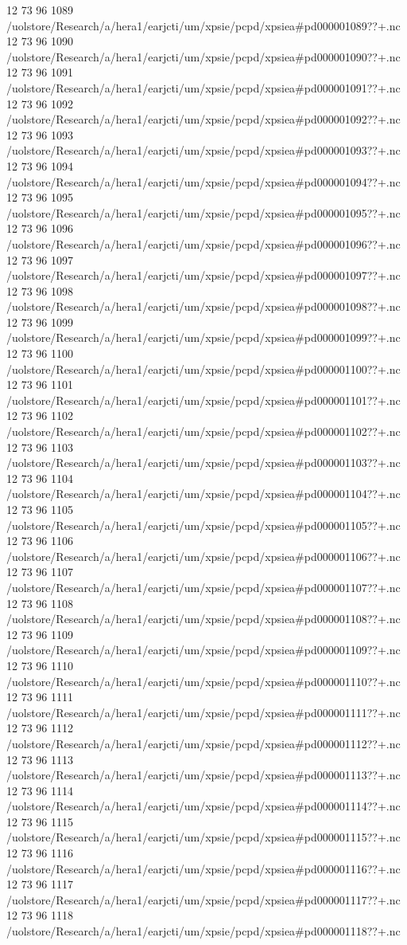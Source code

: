 12 73 96
1089
/uolstore/Research/a/hera1/earjcti/um/xpsie/pcpd/xpsiea#pd000001089??+.nc
12 73 96
1090
/uolstore/Research/a/hera1/earjcti/um/xpsie/pcpd/xpsiea#pd000001090??+.nc
12 73 96
1091
/uolstore/Research/a/hera1/earjcti/um/xpsie/pcpd/xpsiea#pd000001091??+.nc
12 73 96
1092
/uolstore/Research/a/hera1/earjcti/um/xpsie/pcpd/xpsiea#pd000001092??+.nc
12 73 96
1093
/uolstore/Research/a/hera1/earjcti/um/xpsie/pcpd/xpsiea#pd000001093??+.nc
12 73 96
1094
/uolstore/Research/a/hera1/earjcti/um/xpsie/pcpd/xpsiea#pd000001094??+.nc
12 73 96
1095
/uolstore/Research/a/hera1/earjcti/um/xpsie/pcpd/xpsiea#pd000001095??+.nc
12 73 96
1096
/uolstore/Research/a/hera1/earjcti/um/xpsie/pcpd/xpsiea#pd000001096??+.nc
12 73 96
1097
/uolstore/Research/a/hera1/earjcti/um/xpsie/pcpd/xpsiea#pd000001097??+.nc
12 73 96
1098
/uolstore/Research/a/hera1/earjcti/um/xpsie/pcpd/xpsiea#pd000001098??+.nc
12 73 96
1099
/uolstore/Research/a/hera1/earjcti/um/xpsie/pcpd/xpsiea#pd000001099??+.nc
12 73 96
1100
/uolstore/Research/a/hera1/earjcti/um/xpsie/pcpd/xpsiea#pd000001100??+.nc
12 73 96
1101
/uolstore/Research/a/hera1/earjcti/um/xpsie/pcpd/xpsiea#pd000001101??+.nc
12 73 96
1102
/uolstore/Research/a/hera1/earjcti/um/xpsie/pcpd/xpsiea#pd000001102??+.nc
12 73 96
1103
/uolstore/Research/a/hera1/earjcti/um/xpsie/pcpd/xpsiea#pd000001103??+.nc
12 73 96
1104
/uolstore/Research/a/hera1/earjcti/um/xpsie/pcpd/xpsiea#pd000001104??+.nc
12 73 96
1105
/uolstore/Research/a/hera1/earjcti/um/xpsie/pcpd/xpsiea#pd000001105??+.nc
12 73 96
1106
/uolstore/Research/a/hera1/earjcti/um/xpsie/pcpd/xpsiea#pd000001106??+.nc
12 73 96
1107
/uolstore/Research/a/hera1/earjcti/um/xpsie/pcpd/xpsiea#pd000001107??+.nc
12 73 96
1108
/uolstore/Research/a/hera1/earjcti/um/xpsie/pcpd/xpsiea#pd000001108??+.nc
12 73 96
1109
/uolstore/Research/a/hera1/earjcti/um/xpsie/pcpd/xpsiea#pd000001109??+.nc
12 73 96
1110
/uolstore/Research/a/hera1/earjcti/um/xpsie/pcpd/xpsiea#pd000001110??+.nc
12 73 96
1111
/uolstore/Research/a/hera1/earjcti/um/xpsie/pcpd/xpsiea#pd000001111??+.nc
12 73 96
1112
/uolstore/Research/a/hera1/earjcti/um/xpsie/pcpd/xpsiea#pd000001112??+.nc
12 73 96
1113
/uolstore/Research/a/hera1/earjcti/um/xpsie/pcpd/xpsiea#pd000001113??+.nc
12 73 96
1114
/uolstore/Research/a/hera1/earjcti/um/xpsie/pcpd/xpsiea#pd000001114??+.nc
12 73 96
1115
/uolstore/Research/a/hera1/earjcti/um/xpsie/pcpd/xpsiea#pd000001115??+.nc
12 73 96
1116
/uolstore/Research/a/hera1/earjcti/um/xpsie/pcpd/xpsiea#pd000001116??+.nc
12 73 96
1117
/uolstore/Research/a/hera1/earjcti/um/xpsie/pcpd/xpsiea#pd000001117??+.nc
12 73 96
1118
/uolstore/Research/a/hera1/earjcti/um/xpsie/pcpd/xpsiea#pd000001118??+.nc
